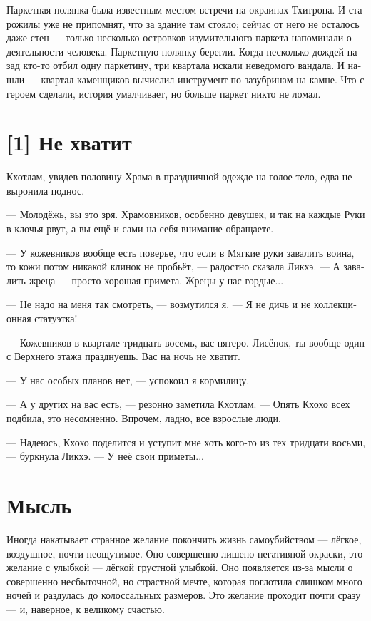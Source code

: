 \documentclass[a4paper,12pt,fleqn]{book}\usepackage{cooltooltips}\usepackage{polyglossia}\setdefaultlanguage[babelshorthands=true]{russian}\setotherlanguage{english}\defaultfontfeatures{Ligatures=TeX,Mapping=tex-text} \usepackage{xcolor}\definecolor{lightgray}{HTML}{bbbbbb}\color{lightgray}\newcommand{\ml}[3]{\textenglish{\textcolor{black}{#3}}}
\begin{document}
{Паркетная полянка была известным местом встречи на окраинах Тхитрона.
И старожилы уже не припомнят, что за здание там стояло;
сейчас от него не осталось даже стен --- только несколько островков изумительного паркета напоминали о деятельности человека.
Паркетную полянку берегли.
Когда несколько дождей назад кто-то отбил одну паркетину, три квартала искали неведомого вандала.
И нашли --- квартал каменщиков вычислил инструмент по зазубринам на камне.
Что с героем сделали, история умалчивает, но больше паркет никто не ломал.

\section{[1] Не хватит}

Кхотлам, увидев половину Храма в праздничной одежде на голое тело, едва не выронила поднос.

--- Молодёжь, вы это зря.
Храмовников, особенно девушек, и так на каждые Руки в клочья рвут, а вы ещё и сами на себя внимание обращаете.

--- У кожевников вообще есть поверье, что если в Мягкие руки завалить воина, то кожи потом никакой клинок не пробьёт, --- радостно сказала Ликхэ.
--- А завалить жреца --- просто хорошая примета.
Жрецы у нас гордые...

--- Не надо на меня так смотреть, --- возмутился я.
--- Я не дичь и не коллекционная статуэтка!

--- Кожевников в квартале тридцать восемь, вас пятеро.
Лисёнок, ты вообще один с Верхнего этажа празднуешь.
Вас на ночь не хватит.

--- У нас особых планов нет, --- успокоил я кормилицу.

--- А у других на вас есть, --- резонно заметила Кхотлам.
--- Опять Кхохо всех подбила, это несомненно.
Впрочем, ладно, все взрослые люди.

--- Надеюсь, Кхохо поделится и уступит мне хоть кого-то из тех тридцати восьми, --- буркнула Ликхэ.
--- У неё свои приметы...

\section{Мысль}

Иногда накатывает странное желание покончить жизнь самоубийством --- лёгкое, воздушное, почти неощутимое.
Оно совершенно лишено негативной окраски, это желание с улыбкой --- лёгкой грустной улыбкой.
Оно появляется из-за мысли о совершенно несбыточной, но страстной мечте, которая поглотила слишком много ночей и раздулась до колоссальных размеров.
Это желание проходит почти сразу --- и, наверное, к великому счастью.

}
\end{document}
